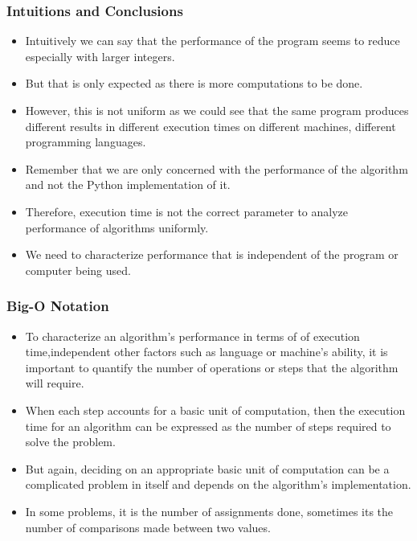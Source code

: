 \documentclass{beamer}
\begin{document}
\begin{frame}
\frametitle{Intuitions and Conclusions}
\begin{itemize}
\item Intuitively we can say that the performance of the program seems to reduce especially with larger integers.
\item But that is only expected as there is more computations to be done.
\item However, this is not uniform as we could see that the same program produces different results in different execution times on different machines, different programming languages.
\item Remember that we are only concerned with the performance of the algorithm and not the Python implementation of it.
\item Therefore, execution time is not the correct parameter to analyze performance of algorithms uniformly.
\item We need to characterize performance that is independent of the program or computer being used.
\end{itemize}
\end{frame}

\begin{frame}
\frametitle{Big-O Notation}
\begin{itemize}
\item To characterize an algorithm's performance in terms of of execution time,independent other factors  such as language or machine's ability, it is important to quantify the number of operations or
steps that the algorithm will require.
\item When each step accounts for a basic unit of computation, then the execution time for an algorithm can be expressed as the number of steps required to solve the problem. 
\item But again, deciding on an appropriate basic unit of computation can be a complicated problem in itself and depends on the algorithm's implementation.
\item In some problems, it is the number of assignments done, sometimes its the number of comparisons made between two values.

\end{itemize}
\end{frame}
\end{document}
